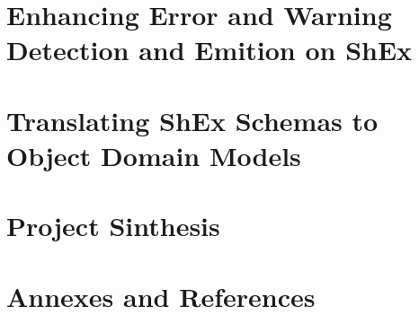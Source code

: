 \documentclass[open=any]{SPhdThesis}
\begin{document}
	\begin{frontmatter}
		\SgAddTitle%
		\SgAddToc%
		\SgAddLof%
		\SgAddLot%
	\end{frontmatter}
   
	
	
	

	\part{Enhancing Error and Warning Detection and Emition on ShEx}
	
	

	\part{Translating ShEx Schemas to Object Domain Models}
	
	

	\part{Project Sinthesis}
	
	
	

	\part{Annexes and References}
	\begin{appendices}
		
		
		
	\end{appendices}

\end{document}
